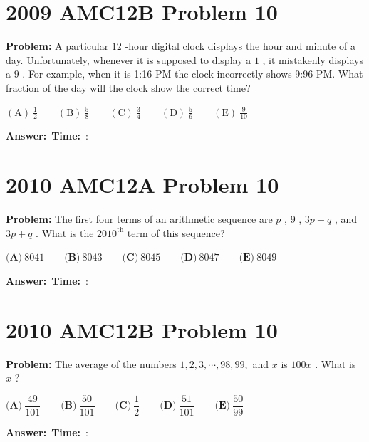\documentclass[12pt]{article}
\begin{document}
\vspace{0.5cm}

\section{2009 AMC12B Problem 10}

\textbf{Problem:}
A particular $12$ -hour digital clock displays the hour and minute of a day. Unfortunately, whenever it is supposed to display a $1$ , it mistakenly displays a $9$ . For example, when it is 1:16 PM the clock incorrectly shows 9:96 PM. What fraction of the day will the clock show the correct time?

$\mathrm{(A)}\ \frac 12\qquad \mathrm{(B)}\ \frac 58\qquad \mathrm{(C)}\ \frac 34\qquad \mathrm{(D)}\ \frac 56\qquad \mathrm{(E)}\ \frac {9}{10}$

\vspace{0.3cm}
\noindent\textbf{Answer:}~\underline{\hspace{5cm}}\hfill\textbf{Time:}~\underline{\hspace{1.2cm}}:\underline{\hspace{1.2cm}}

\vspace{0.5cm}

\section{2010 AMC12A Problem 10}

\textbf{Problem:}
The first four terms of an arithmetic sequence are $p$ , $9$ , $3p-q$ , and $3p+q$ . What is the $2010^\text{th}$ term of this sequence?

$\textbf{(A)}\ 8041 \qquad \textbf{(B)}\ 8043 \qquad \textbf{(C)}\ 8045 \qquad \textbf{(D)}\ 8047 \qquad \textbf{(E)}\ 8049$

\vspace{0.3cm}
\noindent\textbf{Answer:}~\underline{\hspace{5cm}}\hfill\textbf{Time:}~\underline{\hspace{1.2cm}}:\underline{\hspace{1.2cm}}

\vspace{0.5cm}

\section{2010 AMC12B Problem 10}

\textbf{Problem:}
The average of the numbers $1, 2, 3,\cdots, 98, 99,$ and $x$ is $100x$ . What is $x$ ?

$\textbf{(A)}\ \dfrac{49}{101} \qquad \textbf{(B)}\ \dfrac{50}{101} \qquad \textbf{(C)}\ \dfrac{1}{2} \qquad \textbf{(D)}\ \dfrac{51}{101} \qquad \textbf{(E)}\ \dfrac{50}{99}$

\vspace{0.3cm}
\noindent\textbf{Answer:}~\underline{\hspace{5cm}}\hfill\textbf{Time:}~\underline{\hspace{1.2cm}}:\underline{\hspace{1.2cm}}

\vspace{0.5cm}
\end{document}
